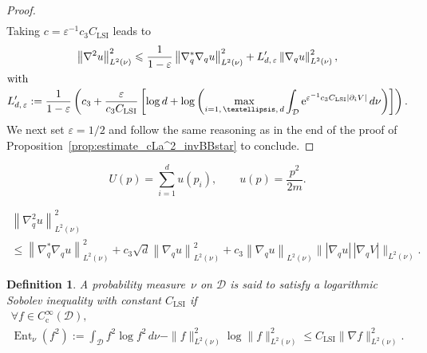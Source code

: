 \documentclass[10pt,a4paper]{article}
\newtheorem{defi}[cdrthm]{Definition}
\numberwithin{equation}{section}
\newcommand{\rme}{\mathrm{e}}
\newcommand{\rmc}{\mathrm{c}}
\newcommand{\LSI}{\mathrm{LSI}}
\DeclareMathOperator{\Ent}{Ent}
\newcommand{\cD}{\mathcal{D}}
\newcommand{\eps}{\varepsilon}
\renewcommand{\leq}{\leqslant}
\let\oldforall\forall
\renewcommand*{\forall}{\mathrel{\oldforall}}
\begin{document}
\begin{proof}
\begin{multline}
\end{multline}
Taking $c = \varepsilon^{-1}c_3 C_{\LSI}$ leads to
\begin{gather*}
\left\|\nabla^2 u\right\|_{L^2(\nu)}^2 \leq \frac{1}{1-\varepsilon}\left\|\nabla_q^{*}\nabla_q u \right\|_{L^2(\nu)}^2 + L'_{d,\, \varepsilon}\left\|\nabla_q u\right\|_{L^2(\nu)}^2,
\\
\intertext{with}
L'_{d,\,\varepsilon} := \frac{1}{1-\varepsilon}\left(c_3 + \frac{\varepsilon}{c_3 C_{\LSI}}\left[\log d + \log\left(\max_{i=1,\,\dots,\,d} \int_\cD \rme^{\varepsilon^{-1}c_3 C_{\LSI}\left|\partial_i V\right|} \, d\nu \right)\right]\right).
\end{gather*}
We next set $\eps = 1/2$ and follow the same reasoning as in the end of the proof of Proposition~\ref{prop:estimate_cLa^2_invBBstar} to conclude.
\end{proof}

\begin{equation}\label{eq:quadratic_kinetic_energy}
U(p) = \sum_{i=1}^d u(p_i), \qquad u(p) = \frac{p^2}{2m}.
\end{equation}

\begin{multline}\label{eq:Bochnereq_CS}
\left\|\nabla_q^2 u\right\|_{L^2(\nu)}^2 \\
\leq \left\|\nabla_q^{*}\nabla_q u \right\|_{L^2(\nu)}^2+ c_{3}\sqrt{d}\left\|\nabla_q u\right\|_{L^2(\nu)}^2 + c_{3}\left\|\nabla_q u\right\|_{L^2(\nu)}\big\| \left|\nabla_{q}u\right| \, \left| \nabla_{q}V\right| \big\|_{L^2(\nu)}.
\end{multline}

\begin{defi}
A probability measure~$\nu$ on $\cD$ is said to satisfy a logarithmic Sobolev inequality with constant $C_{\LSI}$ if
\begin{multline*}
\forall f \in C_\rmc^\infty(\cD), \\ \Ent_{\nu}\left(f^2\right) := \int_{\cD} f^2\log f^2 \, d\nu - \|f\|_{L^2(\nu)}^2\log \|f\|_{L^2(\nu)}^2 \leq C_{\LSI}\|\nabla f\|_{L^2(\nu)}^2.
\end{multline*}
\end{defi}
\end{document}
